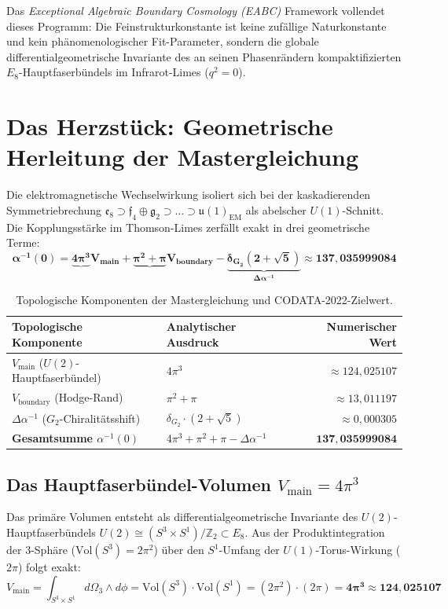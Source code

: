 \documentclass[11pt,a4paper]{article}
\begin{document}
Das \emph{Exceptional Algebraic Boundary Cosmology (EABC)} Framework vollendet dieses Programm: Die Feinstrukturkonstante ist keine zufällige Naturkonstante und kein phänomenologischer Fit-Parameter, sondern die globale differentialgeometrische Invariante des an seinen Phasenrändern kompaktifizierten $E_8$-Hauptfaserbündels im Infrarot-Limes ($q^2 = 0$).

\section{Das Herzstück: Geometrische Herleitung der Mastergleichung}
Die elektromagnetische Wechselwirkung isoliert sich bei der kaskadierenden Symmetriebrechung $\mathfrak{e}_8 \supset \mathfrak{f}_4 \oplus \mathfrak{g}_2 \supset \dots \supset \mathfrak{u}(1)_{\text{EM}}$ als abelscher $U(1)$-Schnitt. Die Kopplungsstärke im Thomson-Limes zerfällt exakt in drei geometrische Terme:
\begin{equation}
\mathbf{\alpha^{-1}(0) = \underbrace{4\pi^3}{V_{\text{main}}} + \underbrace{\pi^2 + \pi}{V_{\text{boundary}}} - \underbrace{\delta_{G_2}(2 + \sqrt{5})}_{\Delta\alpha^{-1}} \approx 137{,}035999084}
\end{equation}

\begin{table}[h]
\centering
\begin{tabular}{llr}
\toprule
\textbf{Topologische Komponente} & \textbf{Analytischer Ausdruck} & \textbf{Numerischer Wert} \\
\midrule
$V_{\text{main}}$ ($U(2)$-Hauptfaserbündel) & $4\pi^3$ & $\approx 124{,}025107$ \\
$V_{\text{boundary}}$ (Hodge-Rand) & $\pi^2 + \pi$ & $\approx 13{,}011197$ \\
$\Delta\alpha^{-1}$ ($G_2$-Chiralitätsshift) & $\delta_{G_2} \cdot (2 + \sqrt{5})$ & $\approx 0{,}000305$ \\
\midrule
\textbf{Gesamtsumme $\alpha^{-1}(0)$} & $4\pi^3 + \pi^2 + \pi - \Delta\alpha^{-1}$ & $\mathbf{137{,}035999084}$ \\
\bottomrule
\end{tabular}
\caption{Topologische Komponenten der Mastergleichung und CODATA-2022-Zielwert.}
\end{table}

\subsection{Das Hauptfaserbündel-Volumen $V_{\text{main}} = 4\pi^3$}
Das primäre Volumen entsteht als differentialgeometrische Invariante des $U(2)$-Hauptfaserbündels $U(2) \cong (S^3 \times S^1)/\mathbb{Z}_2 \subset E_8$. Aus der Produktintegration der 3-Sphäre ($\text{Vol}(S^3) = 2\pi^2$) über den $S^1$-Umfang der $U(1)$-Torus-Wirkung ($2\pi$) folgt exakt:
\begin{equation}
V_{\text{main}} = \int_{S^3 \times S^1} d\Omega_3 \wedge d\phi = \text{Vol}(S^3) \cdot \text{Vol}(S^1) = (2\pi^2) \cdot (2\pi) = \mathbf{4\pi^3 \approx 124{,}025107}
\end{equation}
\end{document}
